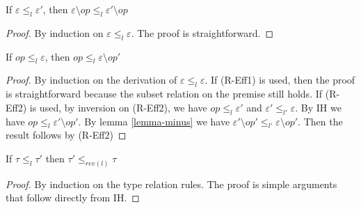 \begin{lemma}
\label{lemma-minus}
If $\varepsilon \leq_l \varepsilon'$, then $\varepsilon \setminus op \leq_l \varepsilon' \setminus op$
\begin{proof}
By induction on $\varepsilon \leq_l \varepsilon$. The proof is straightforward.
\end{proof}

\end{lemma}

\begin{lemma}
\label{lemma-relation}
If $op \leq_{l} \varepsilon$, then $op \leq_{l} \varepsilon \setminus op'$
\begin{proof}
By induction on the derivation of $\varepsilon \leq_l \varepsilon$. If (R-Eff1) is used, then the proof is straightforward because the subset relation on the premise still holds. If (R-Eff2) is used, by inversion on (R-Eff2), we have $op \leq_l \varepsilon'$ and $\varepsilon' \leq_{l'} \varepsilon$. By IH we have $op \leq_l \varepsilon' \setminus op'$. By lemma \ref{lemma-minus} we have $\varepsilon'  \setminus op' \leq_{l'} \varepsilon \setminus op'$. Then the result follows by (R-Eff2)
\end{proof}
\end{lemma}

\begin{lemma}
\label{lemma-relation2}
If $\tau \leq_l \tau'$ then $\tau' \leq_{rev(l)} \tau$
\begin{proof}
By induction on the type relation rules. The proof is simple arguments that follow directly from IH.  
\end{proof}
\end{lemma}

